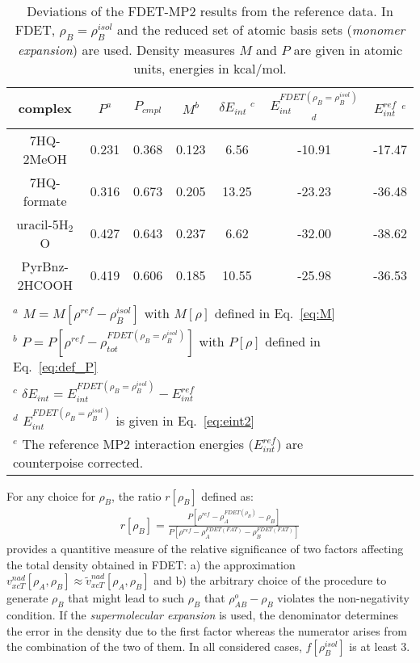 \documentclass[amsmath,amssymb,preprint,aip,jcp]{revtex4-1}
\newcommand{\nr}[1]{\color{red}#1\color{black}}
\begin{document}
\begin{table*}
{
\begin{center}
\begin{tabular}{|c|c|c|c|c|c|c|}
\hline
 complex & $P^a$ & $P_{cmpl}$ & $M^b$ & $\delta E_{int}\;^c$&$E^{FDET(\rho_B=\rho_B^{isol})}_{int}$ $^d$&$E_{int}^{ref}$ $^e$ \\ \hline
7HQ-2MeOH & 0.231 & 0.368 & 0.123 & 6.56 & -10.91 & -17.47 \\ \hline
7HQ-formate & 0.316 & 0.673 & 0.205 & 13.25 & -23.23 & -36.48 \\ \hline
uracil-5H$_2$O & 0.427 & 0.643 & 0.237 & 6.62 & -32.00 & -38.62 \\ \hline
PyrBnz-2HCOOH & 0.419 & 0.606 & 0.185 & 10.55 & -25.98 &  -36.53 \\ \hline
\multicolumn{6}{c}{ } \\
\multicolumn{6}{l}{$^a$ $M=M[\rho^{ref} - \rho^{isol}_{B}]$ with $M[\rho]$ defined in Eq.~\ref{eq:M}}\\
\multicolumn{6}{l}{$^b$ $P=P[\rho^{ref} - \rho_{tot}^{FDET(\rho_B=\rho_B^{isol})}]$ with $P[\rho]$ defined in Eq.~\ref{eq:def_P}}\\
\multicolumn{6}{l}{$^c$ $\delta E_{int}=E^{FDET(\rho_B=\rho_B^{isol})}_{int}-E_{int}^{ref}$} \\
\multicolumn{6}{l}{$^d$ $E^{FDET(\rho_B=\rho_B^{isol})}_{int}$ is given in Eq.~\ref{eq:eint2}}\\
\multicolumn{6}{l}{$^e$ The reference MP2 interaction energies ($E_{int}^{ref}$) are \nr{counterpoise } corrected.}
\end{tabular}
\end{center}
}%
\caption{Deviations of the FDET-MP2 results from the reference data.  In FDET, $\rho_B=\rho_B^{isol}$  and the reduced set of atomic basis sets ({\it monomer expansion}) are used. 
Density measures $M$ and $P$ are given in atomic units, energies in kcal/mol.
}
\label{table:ME_isol}
\end{table*}

For any choice for $\rho_B$,
the ratio \nr{$r[\rho_B]$ } defined as:
\begin{eqnarray}
r[\rho_B]=\frac{P[\rho^{ref} - \rho_{A}^{FDET(\rho_{B})}-\rho_{B}]}{P[\rho^{ref} - \rho_{A}^{FDET(FAT)}-\rho_{B}^{FDET(FAT)}]}
\end{eqnarray}
provides a quantitive measure of the relative significance of two factors affecting the total density obtained in FDET:
a) the approximation $v_{xcT}^{nad}[\rho_A,\rho_B]\approx \tilde{v}_{xcT}^{nad}[\rho_A,\rho_B]$  and b) the arbitrary choice of the procedure to generate $\rho_B$ that might lead to such $\rho_B$ that  
\nr{$\rho_{AB}^o-\rho_B$ }violates the non-negativity condition.
If the {\it supermolecular expansion} is used, the denominator determines the error in the density due to the first factor whereas the numerator arises from the combination of the two of them.
In all considered cases,  $f[\rho_B^{isol}]$ is at least 3.
\end{document}
